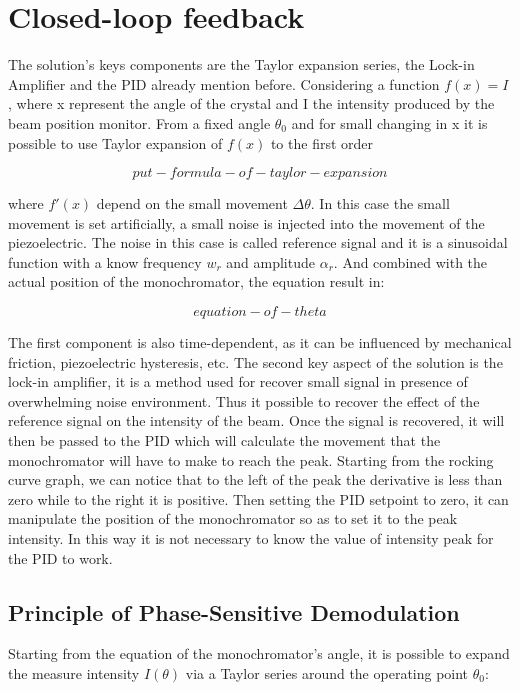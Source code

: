 \section{Closed-loop feedback}

The solution's keys components are the Taylor expansion series, the Lock-in Amplifier and the PID already mention before.
Considering a function $f(x)=I$, where x represent the angle of the crystal and I the intensity produced by the beam position monitor.
From a fixed angle $\theta_0$ and for small changing in x it is possible to use Taylor expansion of $f(x)$ to the first order

\begin{equation}
    put-formula-of-taylor-expansion
\end{equation}


where $f'(x)$ depend on the small movement $\Delta\theta$.
In this case the small movement is set artificially, a small noise is injected into the movement of the piezoelectric.
The noise in this case is called reference signal and it is a sinusoidal function with a know frequency $w_{r}$ and amplitude $\alpha_r$.
And combined with the actual position of the monochromator, the equation result in:

\begin{equation}
    equation-of-theta
\end{equation}

The first component is also time-dependent, as it can be influenced by mechanical friction, piezoelectric hysteresis, etc.
The second key aspect of the solution is the lock-in amplifier, it is a method used for recover small signal in presence of overwhelming noise environment.
Thus it possible to recover the effect of the reference signal on the intensity of the beam.
Once the signal is recovered, it will then be passed to the PID which will calculate the movement that the monochromator will have to make to reach the peak.
Starting from the rocking curve graph, we can notice that to the left of the peak the derivative is less than zero while to the right it is positive.
Then setting the PID setpoint to zero, it can manipulate the position of the monochromator so as to set it to the peak intensity.
In this way it is not necessary to know the value of intensity peak for the PID to work.

\subsection{Principle of Phase-Sensitive Demodulation}
Starting from the equation of the monochromator's angle, it is possible to expand the measure intensity $I(\theta)$ via a Taylor series around the operating point $\theta_0$:

